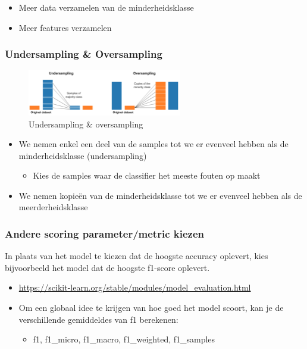 \documentclass{article}
\begin{document}
\begin{itemize}
    \item Meer data verzamelen van de minderheidsklasse
    \item Meer features verzamelen
\end{itemize}

\subsubsection{Undersampling \& Oversampling}

\begin{figure}[H]
    \centering
    \includegraphics[width=0.6\textwidth]{niet-gebalanceerde-data-sampling.png}
    \caption{Undersampling \& oversampling}
\end{figure}

\begin{itemize}
    \item We nemen enkel een deel van de samples tot we er evenveel hebben als de minderheidsklasse (undersampling)
    \begin{itemize}
        \item Kies de samples waar de classifier het meeste fouten op maakt
    \end{itemize}
    \item We nemen kopieën van de minderheidsklasse tot we er evenveel hebben als de meerderheidsklasse
\end{itemize}

\subsubsection{Andere scoring parameter/metric kiezen}

In plaats van het model te kiezen dat de hoogste accuracy oplevert, kies bijvoorbeeld het model dat de hoogste f1-score oplevert.

\begin{itemize}
    \item \url{https://scikit-learn.org/stable/modules/model_evaluation.html}
    \item Om een globaal idee te krijgen van hoe goed het model scoort, kan je de verschillende gemiddeldes van f1 berekenen:
    \begin{itemize}
        \item f1, f1\_micro, f1\_macro, f1\_weighted, f1\_samples
    \end{itemize}
\end{itemize}
\end{document}
